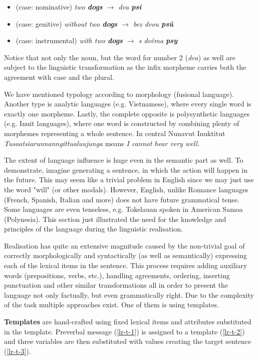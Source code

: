 \begin{itemize}
	\item (case: nominative) \emph{two \textbf{dogs}	$\rightarrow$ dva \textbf{psi}}
	\item (case: genitive) 	\emph{without two \textbf{dogs}  $\rightarrow$ bez dvou \textbf{psů}}
	\item (case: instrumental) \emph{with two \textbf{dogs} 	$\rightarrow$ s dvěma \textbf{psy}}
\end{itemize}

Notice that not only the noun, but the word for number 2 (\emph{dva}) as well are subject to the linguistic transformation as the infix morpheme carries both the agreement with case and the plural. 

We have mentioned typology according to morphology (fusional language). Another type is analytic languages (e.g. Vietnamese), where every single word is exactly one morpheme. Lastly, the complete opposite is polysynthetic languages (e.g. Inuit languages), where one word is constructed by combining plenty of morphemes representing a whole sentence. In central Nunavut Inuktitut \emph{Tusaatsiarunnanngittualuujunga} means \emph{I cannot hear very well}. 

The extent of language influence is huge even in the semantic part as well. To demonstrate, imagine generating a sentence, in which the action will happen in the future. This may seem like a trivial problem in English since we may just use the word "will" (or other modals). However, English, unlike Romance languages (French, Spanish, Italian and more) does not have future grammatical tense. Some languages are even tenseless, e.g. Tokelauan spoken in American Samoa (Polynesia). This section just illustrated the need for the knowledge and principles of the language during the linguistic realisation.  

Realisation has quite an extensive magnitude caused by the non-trivial goal of correctly morphologically and syntactically (as well as semantically) expressing each of the lexical items in the sentence. This process requires adding auxiliary words (prepositions, verbs, etc.), handling agreements, ordering,  inserting punctuation and other similar transformations all in order to present the language not only factually, but even grammatically right. Due to the complexity of the task multiple approaches exist. One of them is using templates. 

\textbf{Templates} are hand-crafted using fixed lexical items and attributes substituted in the template. Preverbal message (\ref{lr-t-1}) is assigned to a template (\ref{lr-t-2}) and three variables are then substituted with values creating the target sentence (\ref{lr-t-3}). 


